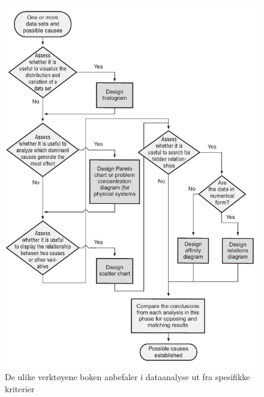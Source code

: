 \begin{figure}[H]
    \centering
\includegraphics[scale=0.65]{main/bilder/verktoyvalg/verktoyvalg_dataanalyse.pdf}
    \caption[Verktøyvalg for dataanalyse]{De ulike verktøyene boken anbefaler i dataanalyse ut fra spesifikke kriterier}
    \label{fig:verktoyvalg-dataanalyse}
\end{figure}

